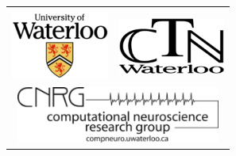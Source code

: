 \documentclass[landscape,final,a0paper,fontscale=0.35]{baposter}
\begin{document}
\begin{poster}
{  }
  {
    \begin{tabular}{cc}
      \relax\\
      \includegraphics[height=6.0em]{uwaterloo.png} &
      \includegraphics[height=5.0em]{ctn.png}\\
      \multicolumn{2}{c}{
        \includegraphics[height=5.0em]{cnrg.png}}
    \end{tabular}
  }

    \newcommand{\colouredcircle}{%
      \tikz{\useasboundingbox (-0.2em,-0.32em) rectangle(0.2em,0.32em); \draw[draw=black,fill=headerfade,line width=0.03em] (0,0) circle(0.18em);}}

    \newenvironment{blockitemize}
    {%
      \begin{minipage}{\columnwidth - 2em}
      \begin{itemize}
        \setlength{\itemsep}{0.3em}

        \raggedright
    }{
      \end{itemize}
      \end{minipage}
    }


\end{poster}
\end{document}
